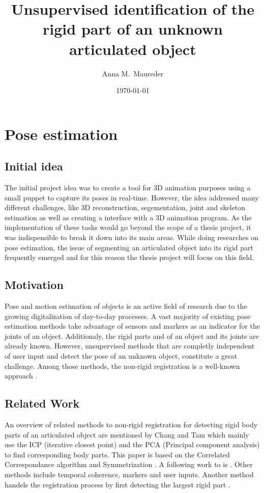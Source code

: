 \documentclass[a4paper,english,11pt]{report}
\author{Anna M.\ Maureder}
\title{Unsupervised identification of the rigid part of an unknown articulated object}
\date{\today}
\begin{document}
\maketitle
\tableofcontents

\chapter {Pose estimation}

\section{Initial idea}

The initial project idea was to create a tool for 3D animation purposes using a small puppet to capture its poses in real-time. However, the idea addressed many different challenges, like 3D reconstruction, segementation, joint and skeleton estimation as well as creating a interface with a 3D animation program. As the implementation of these tasks would go beyond the scope of a thesis project, it was indispensible to break it down into its main areas. While doing researches on pose estimation, the issue of segmenting an articulated object into its rigid part frequently emerged and for this reason the thesis project will focus on this field.

\section{Motivation}

Pose and motion estimation of objects is an active field of research due to the growing digitalization of day-to-day processes. A vast majority of existing pose estimation methods take advantage of sensors and markers as an indicator for the joints of an object. Additionaly, the rigid parts and of an object and its joints are already known. However, unsupervised methods that are completly independent of user input and detect the pose of an unknown object, constitute a great challenge. Among those methods, the non-rigid registration is a well-known approach \cite{survey}.

\section{Related Work}
\label{cha:relatedWork}

An overview of related methods to non-rigid registration for detecting rigid body parts of an articulated object are mentioned by Chang \cite{chang08articulated} and Tam  which mainly use the ICP (iterative closest point) and the PCA (Principal component analysis) to find corresponding body parts. This paper is based on the Correlated Correspondance algorithm \cite{CorrelatedCorrespondance} \cite{Anguelov04} and Symmetrization \cite{Mitra07}. A following work to \cite{chang08articulated} is \cite{chang09range}. Other methods include temporal coherence, markers and user inputs. Another method handels the registration process by first detecting the largest rigid part \cite{correspondence}.
\end{document}
